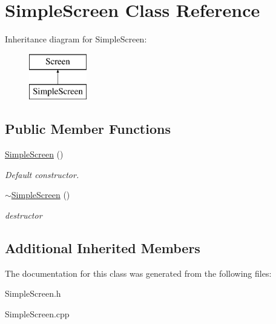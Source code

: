 \hypertarget{class_simple_screen}{}\section{Simple\+Screen Class Reference}
\label{class_simple_screen}
Inheritance diagram for Simple\+Screen\+:\begin{figure}[H]
\begin{center}
\leavevmode
\includegraphics[height=2.000000cm]{class_simple_screen}
\end{center}
\end{figure}
\subsection*{Public Member Functions}
\begin{DoxyCompactItemize}
\item 
\hypertarget{class_simple_screen_af27275c09a784299846ccbabce46db2f}{}\hyperlink{class_simple_screen_af27275c09a784299846ccbabce46db2f}{Simple\+Screen} ()\label{class_simple_screen_af27275c09a784299846ccbabce46db2f}

\begin{DoxyCompactList}\small\item\em Default constructor. \end{DoxyCompactList}\item 
\hypertarget{class_simple_screen_a6cb5a9e1c39a1d5fa6b80a95dc5ec817}{}\hyperlink{class_simple_screen_a6cb5a9e1c39a1d5fa6b80a95dc5ec817}{$\sim$\+Simple\+Screen} ()\label{class_simple_screen_a6cb5a9e1c39a1d5fa6b80a95dc5ec817}

\begin{DoxyCompactList}\small\item\em destructor \end{DoxyCompactList}\end{DoxyCompactItemize}
\subsection*{Additional Inherited Members}


The documentation for this class was generated from the following files\+:\begin{DoxyCompactItemize}
\item 
Simple\+Screen.\+h\item 
Simple\+Screen.\+cpp\end{DoxyCompactItemize}
